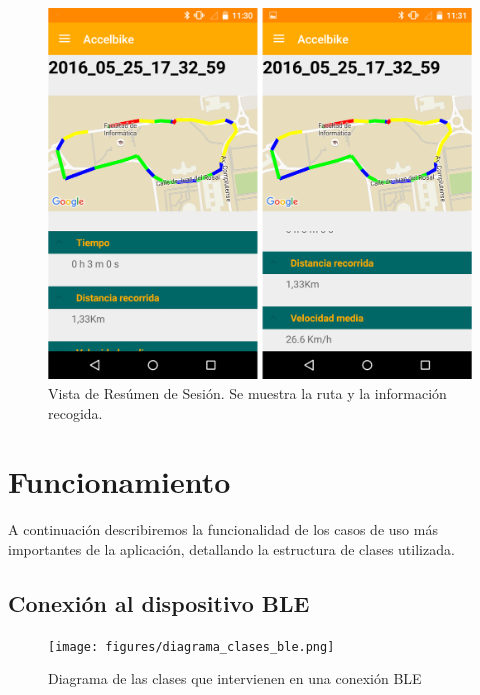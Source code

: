 \begin{figure}[h]%
	\centering
    \includegraphics[scale=0.2]{figures/app_resumen_sesion.png} %
    \caption[Vista de resumen de sesión]{Vista de Resúmen de Sesión. Se muestra la ruta y la información recogida.}
   	\label{figuraAPPSesion}
\end{figure}

\section{Funcionamiento}
\label{makereference6.2}

A continuación describiremos la funcionalidad de los casos de uso más importantes de la aplicación, detallando la estructura de clases utilizada.

\subsection{Conexión al dispositivo BLE}
\label{makereference6.2.1}

\begin{figure}[h]%
  \centering
    \texttt{[image: figures/diagrama\_clases\_ble.png]} %
    \caption[Diagrama de las clases que intervienen en una conexión BLE]{Diagrama de las clases que intervienen en una conexión BLE}
    \label{figuraDiagramaClasesBLE}
\end{figure}

